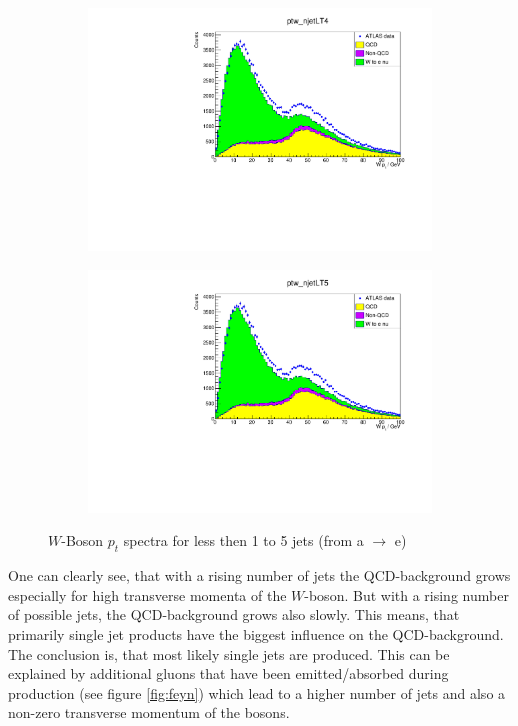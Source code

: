 \documentclass[11pt,a4paper,notitlepage]{scrartcl}
\begin{document}
\begin{figure}[h]
	\begin{subfigure}{.33\linewidth}
		\includegraphics[width=\linewidth]{P1_pics/ptw_jets/ptw_njet3.pdf}
		\caption{}
	\end{subfigure}
	\begin{subfigure}{.33\linewidth}
		\includegraphics[width=\linewidth]{P1_pics/ptw_jets/ptw_njet4.pdf}
		\caption{}
	\end{subfigure}
	\caption{$W$-Boson $p_t$ spectra for less then 1 to 5 jets (from a $\to$ e)}\label{fig:jet_influence_on_w_mass}
\end{figure}

One can clearly see, that with a rising number of jets the QCD-background grows especially for high transverse momenta of the $W$-boson. But with a rising number of possible jets, the QCD-background grows also slowly. This means, that primarily single jet products have the biggest influence on the QCD-background. The conclusion is, that most likely single jets are produced. This can be explained by additional gluons that have been emitted/absorbed during production (see figure \ref{fig:feyn}) which lead to a higher number of jets and also a non-zero transverse momentum of the bosons.
\end{document}
